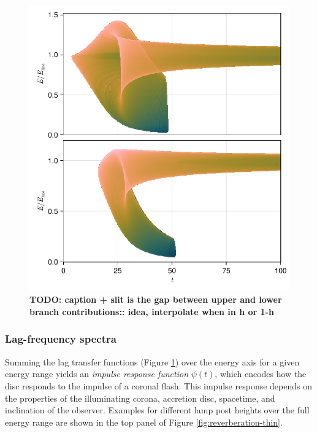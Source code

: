 \documentclass[fleqn,usenatbib]{mnras}
\newcommand{\todo}[1]{{\noindent \bf \color{red} TODO: #1}}
\begin{document}
\begin{figure}
	\centering
	\includegraphics[width=0.97\linewidth]{figures/transfer-functions.2d.pdf}
	\caption{\todo{caption + slit is the gap between upper and lower branch contributions:: idea, interpolate when in h or 1-h}}
	\label{fig:lag-frequency-transfer-functions}
\end{figure}

\subsubsection{Lag-frequency spectra}


Summing the lag transfer functions (Figure
\ref{fig:lag-frequency-transfer-functions}) over the energy axis for a given
energy range yields an \textit{impulse response function} $\psi(t)$, which
encodes how the disc responds to the impulse of a coronal flash. This impulse
response depends on the properties of the illuminating corona, accretion disc,
spacetime, and inclination of the observer. Examples for different lamp post
heights over the full energy range are shown in the top panel of Figure
\ref{fig:reverberation-thin}.
\end{document}
